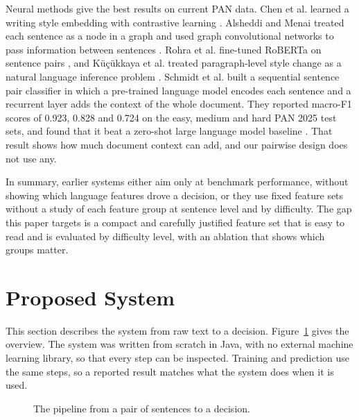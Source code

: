 \documentclass[runningheads]{llncs}
\begin{document}
Neural methods give the best results on current PAN data. Chen et al. learned a writing style embedding with contrastive learning \cite{chen2023writing}. Alsheddi and Menai treated each sentence as a node in a graph and used graph convolutional networks to pass information between sentences \cite{alsheddi2025team}. Rohra et al. fine-tuned RoBERTa on sentence pairs \cite{rohra2025sentence}, and K{\"u}{\c{c}}{\"u}kkaya et al. treated paragraph-level style change as a natural language inference problem \cite{kucukkaya2023arc}. Schmidt et al. built a sequential sentence pair classifier in which a pre-trained language model encodes each sentence and a recurrent layer adds the context of the whole document. They reported macro-F1 scores of 0.923, 0.828 and 0.724 on the easy, medium and hard PAN 2025 test sets, and found that it beat a zero-shot large language model baseline \cite{schmidt2025team}. That result shows how much document context can add, and our pairwise design does not use any.

In summary, earlier systems either aim only at benchmark performance, without showing which language features drove a decision, or they use fixed feature sets without a study of each feature group at sentence level and by difficulty. The gap this paper targets is a compact and carefully justified feature set that is easy to read and is evaluated by difficulty level, with an ablation that shows which groups matter.

\section{Proposed System}
\label{sec:system}

This section describes the system from raw text to a decision. Figure~\ref{fig:pipeline} gives the overview. The system was written from scratch in Java, with no external machine learning library, so that every step can be inspected. Training and prediction use the same steps, so a reported result matches what the system does when it is used.

\begin{figure}[t]
\centering
{}
\caption{The pipeline from a pair of sentences to a decision.}
\label{fig:pipeline}
\end{figure}
\end{document}
